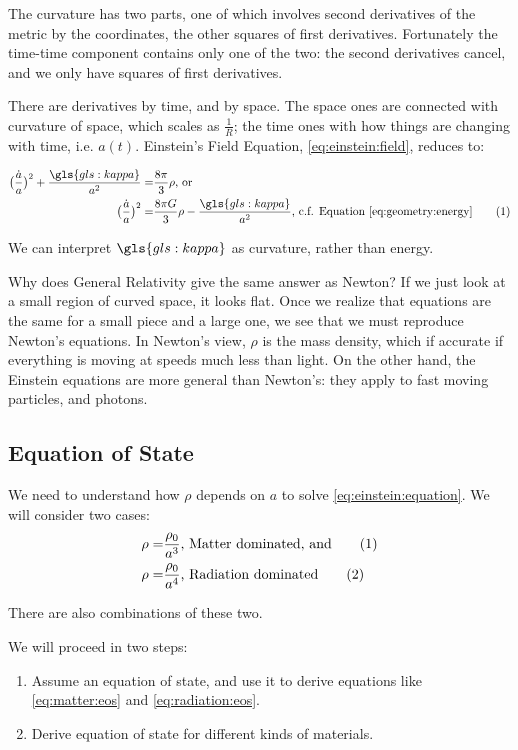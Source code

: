 \documentclass[]{article}
\newcommand\numberthis{\addtocounter{equation}{1}\tag{\theequation}}
\begin{document}
The curvature has two parts, one of which involves second derivatives of the metric by the coordinates, the other squares of first derivatives. Fortunately the time-time component contains only one of the two: the second derivatives cancel, and we only have squares of first derivatives.

There are derivatives by time, and by space. The space ones are connected with curvature of space, which scales as $\frac{1}{R}$; the time ones with how things are changing with time, i.e. $a(t)$. Einstein's Field Equation, \eqref{eq:einstein:field}, reduces to:

\begin{align*}
	\big(\frac{\dot{a}}{a}\big)^2 + \frac{\gls{gls:kappa}}{a^2}=& \frac{8\pi}{3} \rho \text{, or}\\
	\big(\frac{\dot{a}}{a}\big)^2 =& \frac{8\pi G}{3}\rho - \frac{\gls{gls:kappa}}{a^2} \text{, c.f. Equation \eqref{eq:geometry:energy}} \numberthis \label{eq:einstein:equation}
\end{align*}

We can interpret $\gls{gls:kappa}$ as curvature, rather than energy.

Why does General Relativity give the same answer as Newton? If we just look at a small region of curved space, it looks flat. Once we realize that equations are the same for a small piece and a large one, we see that we must reproduce Newton's equations. In Newton's view, $\rho$ is the mass density, which if accurate if everything is moving at speeds much less than light. On the other hand, the Einstein equations are more general than Newton's: they apply to fast moving particles, and photons.

\subsection{Equation of State}\label{sec:equation:state}

We need to understand how $\rho$ depends on $a$ to solve \eqref{eq:einstein:equation}. We will consider two cases:
\begin{align*}
	\rho=&\frac{\rho_0}{a^3} \text{, Matter dominated, and} \numberthis \label{eq:matter:eos}\\
	\rho=&\frac{\rho_0}{a^4} \text{,  Radiation dominated} \numberthis \label{eq:radiation:eos}
\end{align*}

There are also combinations of these two.

We will proceed in two steps:
\begin{enumerate}
	\item Assume an equation of state, and use it to derive equations like \eqref{eq:matter:eos} and \eqref{eq:radiation:eos}.
	\item Derive equation of state for different kinds of materials.
\end{enumerate}
\end{document}
